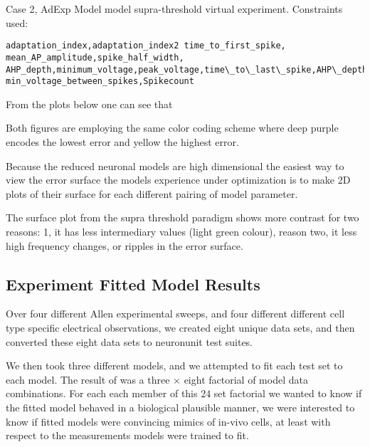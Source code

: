 Case 2, AdExp Model model supra-threshold virtual experiment. Constraints used:
\begin{verbatim}
adaptation_index,adaptation_index2 time_to_first_spike, mean_AP_amplitude,spike_half_width, AHP_depth,minimum_voltage,peak_voltage,time\_to\_last\_spike,AHP\_depth\_abs,all_ISI_valuesvoltage_base, min_voltage_between_spikes,Spikecount
 \end{verbatim}

From the plots below one can see that 


Both figures are employing the same color coding scheme where deep purple encodes the lowest error and yellow the highest error.

Because the reduced neuronal models are high dimensional the easiest way to view the error surface the models experience under optimization is to make 2D plots of their surface for each different pairing of model parameter.

The surface plot from the supra threshold paradigm shows more contrast for two reasons: 1, it has less intermediary values (light green colour), reason two, it less high frequency changes, or ripples in the error surface.  

\subsection{Experiment Fitted Model Results} 


Over four different Allen experimental sweeps, and four different different cell type specific electrical observations, we created eight unique data sets, and then converted these eight data sets to neuronunit test suites.

We then took three different models, and we attempted to fit each test set to each model. The result of was a three $\times $ eight factorial of model data combinations. For each each member of this $24$ set factorial we wanted to know if the fitted model behaved in a biological plausible manner, we were interested to know if fitted models were convincing mimics of in-vivo cells, at least with respect to the measurements models were trained to fit.


